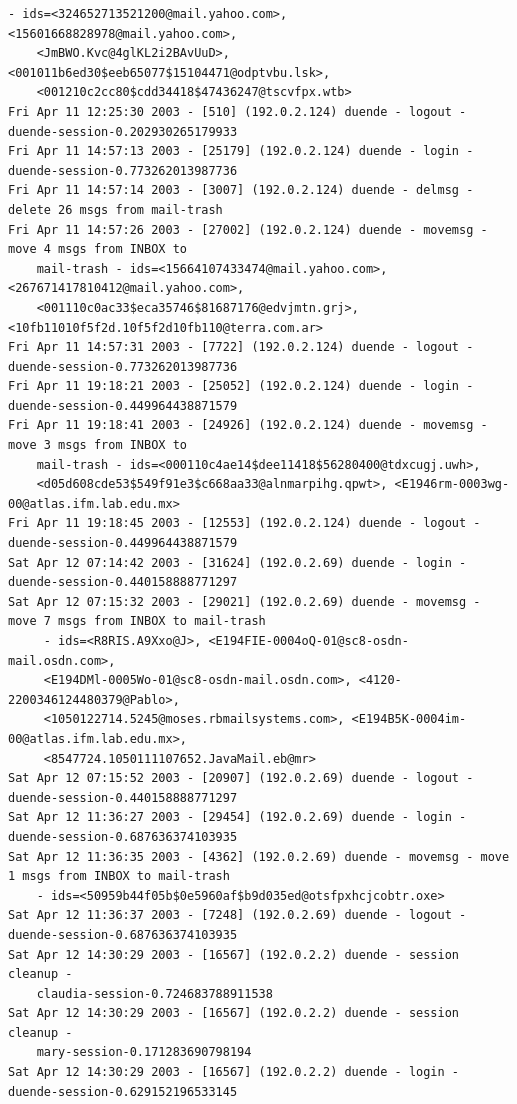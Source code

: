 \begin{lstlisting}[style=terminal]
    - ids=<324652713521200@mail.yahoo.com>, <15601668828978@mail.yahoo.com>, 
    <JmBWO.Kvc@4glKL2i2BAvUuD>, <001011b6ed30$eeb65077$15104471@odptvbu.lsk>, 
    <001210c2cc80$cdd34418$47436247@tscvfpx.wtb>
Fri Apr 11 12:25:30 2003 - [510] (192.0.2.124) duende - logout - duende-session-0.202930265179933
Fri Apr 11 14:57:13 2003 - [25179] (192.0.2.124) duende - login - duende-session-0.773262013987736
Fri Apr 11 14:57:14 2003 - [3007] (192.0.2.124) duende - delmsg - delete 26 msgs from mail-trash
Fri Apr 11 14:57:26 2003 - [27002] (192.0.2.124) duende - movemsg - move 4 msgs from INBOX to 
    mail-trash - ids=<15664107433474@mail.yahoo.com>, <267671417810412@mail.yahoo.com>, 
    <001110c0ac33$eca35746$81687176@edvjmtn.grj>, <10fb11010f5f2d.10f5f2d10fb110@terra.com.ar>
Fri Apr 11 14:57:31 2003 - [7722] (192.0.2.124) duende - logout - duende-session-0.773262013987736
Fri Apr 11 19:18:21 2003 - [25052] (192.0.2.124) duende - login - duende-session-0.449964438871579
Fri Apr 11 19:18:41 2003 - [24926] (192.0.2.124) duende - movemsg - move 3 msgs from INBOX to 
    mail-trash - ids=<000110c4ae14$dee11418$56280400@tdxcugj.uwh>, 
    <d05d608cde53$549f91e3$c668aa33@alnmarpihg.qpwt>, <E1946rm-0003wg-00@atlas.ifm.lab.edu.mx>
Fri Apr 11 19:18:45 2003 - [12553] (192.0.2.124) duende - logout - duende-session-0.449964438871579
Sat Apr 12 07:14:42 2003 - [31624] (192.0.2.69) duende - login - duende-session-0.440158888771297
Sat Apr 12 07:15:32 2003 - [29021] (192.0.2.69) duende - movemsg - move 7 msgs from INBOX to mail-trash
     - ids=<R8RIS.A9Xxo@J>, <E194FIE-0004oQ-01@sc8-osdn-mail.osdn.com>, 
     <E194DMl-0005Wo-01@sc8-osdn-mail.osdn.com>, <4120-2200346124480379@Pablo>, 
     <1050122714.5245@moses.rbmailsystems.com>, <E194B5K-0004im-00@atlas.ifm.lab.edu.mx>, 
     <8547724.1050111107652.JavaMail.eb@mr>
Sat Apr 12 07:15:52 2003 - [20907] (192.0.2.69) duende - logout - duende-session-0.440158888771297
Sat Apr 12 11:36:27 2003 - [29454] (192.0.2.69) duende - login - duende-session-0.687636374103935
Sat Apr 12 11:36:35 2003 - [4362] (192.0.2.69) duende - movemsg - move 1 msgs from INBOX to mail-trash 
    - ids=<50959b44f05b$0e5960af$b9d035ed@otsfpxhcjcobtr.oxe>
Sat Apr 12 11:36:37 2003 - [7248] (192.0.2.69) duende - logout - duende-session-0.687636374103935
Sat Apr 12 14:30:29 2003 - [16567] (192.0.2.2) duende - session cleanup - 
    claudia-session-0.724683788911538
Sat Apr 12 14:30:29 2003 - [16567] (192.0.2.2) duende - session cleanup - 
    mary-session-0.171283690798194
Sat Apr 12 14:30:29 2003 - [16567] (192.0.2.2) duende - login - duende-session-0.629152196533145

\end{lstlisting}

